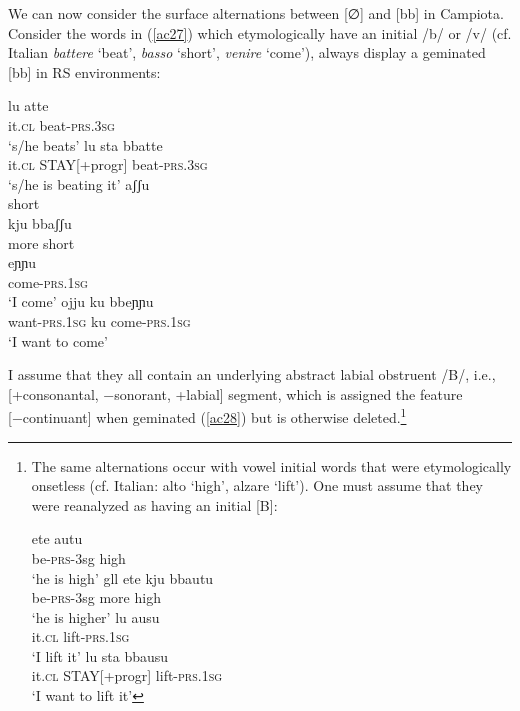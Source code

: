 \documentclass[output=paper]{langscibook}
\begin{document}
We can now consider the surface alternations between [∅] and [bb] in Campiota.  Consider the words in (\ref{ac27}) which etymologically have an initial /b/ or /v/ (cf. Italian \textit{battere} ‘beat’, \textit{basso} ‘short’, \textit{venire} ‘come’), always display a geminated [bb] in RS environments:

\ea\label{ac27}
    \ea\label{ac27a}
        \ea \label{ac27ai}\gll lu atte\\
            it.\textsc{cl} beat-\textsc{prs}.\textsc{3sg}\\  
            \glt `s/he beats'  
        \ex \label{ac27aii}\gll lu   sta     bbatte\\
            it.\textsc{cl} STAY[+progr] beat-\textsc{prs}.\textsc{3sg}\\
            \glt `s/he is beating it'
        \z
    \ex\label{ac27b}
        \ea \label{ac27bi}\gll aʃʃu\\
                short\\
        \ex \label{ac27bii}\gll kju     bbaʃʃu\\
                more    short\\
        \z
    \ex\label{ac27c}
        \ea \label{ac27ci}\gll eɲɲu\\
            come-\textsc{prs}.\textsc{1sg}\\ 
            \glt `I come'   
        \ex \label{ac27cii}\gll ojju      ku   bbeɲɲu\\
            want-\textsc{prs}.\textsc{1sg} ku   come-\textsc{prs}.\textsc{1sg}\\
            \glt `I want to come' 
        \z
    \z
\z

I assume that they all contain an underlying abstract labial obstruent /B/, i.e., [+consonantal, −sonorant, +labial] segment, which is assigned the feature [−continuant] when geminated (\ref{ac28}) but is otherwise deleted.\footnote{The same alternations occur with vowel initial words that were etymologically onsetless (cf. Italian: alto `high', alzare `lift').  One must assume that they were reanalyzed as having an initial [B]:

\ea \label{fn14ex}
    \ea \label{fn14exa}
        \ea \label{fn14exai}\gll ete autu\\
            be-\textsc{prs}-3sg high\\
            \glt ‘he is high’    
        \ex \label{fn14exaii}gll ete kju bbautu\\
            be-\textsc{prs}-3sg more high\\
            \glt ‘he is higher’
        \z
    \ex \label{fn14exb}
        \ea \label{fn14exbi}\gll lu ausu\\
            it.\textsc{cl} lift-\textsc{prs}.\textsc{1sg}\\
            \glt ‘I lift it’  
        \ex \label{fn14exbii}\gll lu sta bbausu\\
            it.\textsc{cl} STAY[+progr]  lift-\textsc{prs}.\textsc{1sg}\\
            \glt ‘I want to lift it’
        \z
    \z
\z

}
\end{document}
